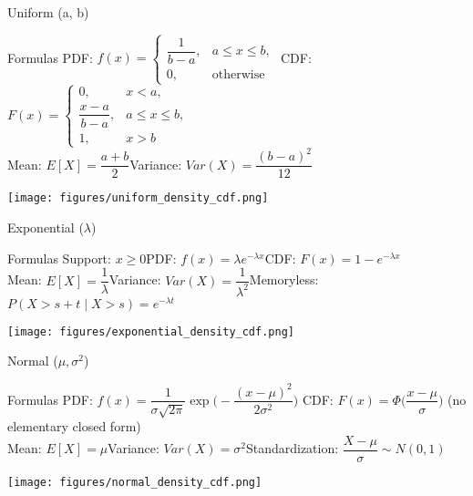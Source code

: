\documentclass[aspectratio=43]{beamer}
\def\P{P}%
\def\E{E}%
\def\Var{Var}%
\def\mathbb#1{#1}%
\def\mathcal#1{#1}%
\renewcommand{\P}{\mathbb{P}}
\newcommand{\E}{\mathbb{E}}
\newcommand{\Var}{\operatorname{Var}}
\newcommand{\1}{\mathbf{1}}
\begin{document}
\begin{frame}{Uniform (a, b)}{}
  {\footnotesize\begin{block}{Formulas}
    PDF: $f(x)=\begin{cases}\dfrac{1}{b-a}, & a\le x\le b,\\ 0, & \text{otherwise}\end{cases}$\quad
    CDF: $F(x)=\begin{cases}0, & x<a,\\ \dfrac{x-a}{b-a}, & a\le x\le b,\\ 1, & x>b\end{cases}$\\[0.4em]
    Mean: $\E[X]=\dfrac{a+b}{2}$\quad Variance: $\Var(X)=\dfrac{(b-a)^2}{12}$
  \end{block}}
  \begin{center}
    \texttt{[image: figures/uniform\_density\_cdf.png]}
  \end{center}
\end{frame}

\begin{frame}{Exponential (\texorpdfstring{$\lambda$}{lambda})}{}
  {\footnotesize\begin{block}{Formulas}
    Support: $x\ge 0$\quad PDF: $f(x)=\lambda e^{-\lambda x}$\quad CDF: $F(x)=1-e^{-\lambda x}$\\[0.4em]
    Mean: $\E[X]=\dfrac{1}{\lambda}$\quad Variance: $\Var(X)=\dfrac{1}{\lambda^2}$\quad Memoryless: $\P(X>s+t\mid X>s)=e^{-\lambda t}$
  \end{block}}
  \begin{center}
    \texttt{[image: figures/exponential\_density\_cdf.png]}
  \end{center}
\end{frame}

\begin{frame}{Normal (\texorpdfstring{$\mu,\sigma^2$}{mu, sigma^2})}{}
  {\footnotesize\begin{block}{Formulas}
    PDF: $f(x)=\dfrac{1}{\sigma\sqrt{2\pi}}\exp\!\Big(-\dfrac{(x-\mu)^2}{2\sigma^2}\Big)$\quad
    CDF: $F(x)=\Phi\!\Big(\dfrac{x-\mu}{\sigma}\Big)$ (no elementary closed form)\\[0.4em]
    Mean: $\E[X]=\mu$\quad Variance: $\Var(X)=\sigma^2$\quad Standardization: $\dfrac{X-\mu}{\sigma}\sim\mathcal{N}(0,1)$
  \end{block}}
  \begin{center}
    \texttt{[image: figures/normal\_density\_cdf.png]}
  \end{center}
\end{frame}
\end{document}
